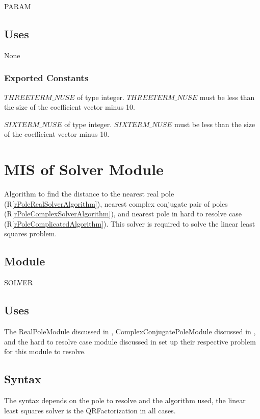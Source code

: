 \documentclass[12pt, titlepage]{article}
\newcommand{\rref}[1]{(R\ref{#1})}
\begin{document}
PARAM

\subsection{Uses}

None

\subsubsection{Exported Constants}

\noindent $THREETERM\_NUSE$ of type integer. $THREETERM\_NUSE$ must be less than the size of the coefficient vector minus 10.

\noindent $SIXTERM\_NUSE$ of type integer. $SIXTERM\_NUSE$ must be less than the size of the coefficient vector minus 10.

\section{MIS of Solver Module} \label{sc:MIS_SOLVER}

Algorithm to find the distance to the
 nearest real pole \rref{rPoleRealSolverAlgorithm},
 nearest complex conjugate pair of poles \rref{rPoleComplexSolverAlgorithm}, and
 nearest pole in hard to resolve case \rref{rPoleComplicatedAlgorithm}.
This solver is required to solve the linear least squares problem.

\subsection{Module}

SOLVER

\subsection{Uses}

The RealPoleModule discussed in ,
 ComplexConjugatePoleModule discussed in , and
 the hard to resolve case module discussed in 
 set up their respective problem for this module to resolve.

\subsection{Syntax}

The syntax depends on the pole to resolve and the algorithm used, the linear least squares
solver is the QRFactorization in all cases.
\end{document}
